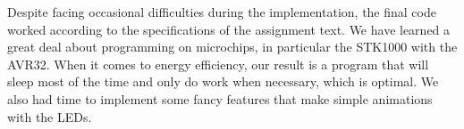 Despite facing occasional difficulties during the implementation, the final code worked according to the specifications of the assignment text. We have learned a great deal about programming on microchips, in particular the STK1000 with the AVR32. When it comes to energy efficiency, our result is a program that will sleep most of the time and only do work when necessary, which is optimal. We also had time to implement some fancy features that make simple animations with the LEDs.
